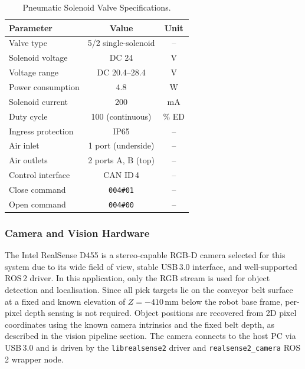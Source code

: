 \begin{table}[htbp]
    \centering
    \caption{Pneumatic Solenoid Valve Specifications.}
    \label{tab:pneumatic_spec}
    {\small
    \begin{tabular}{lcc}
        \hline
        \textbf{Parameter} & \textbf{Value} & \textbf{Unit} \\
        \hline
        Valve type              & 5/2 single-solenoid & -- \\
        Solenoid voltage        & DC 24       & V \\
        Voltage range           & DC 20.4--28.4 & V \\
        Power consumption       & 4.8         & W \\
        Solenoid current        & 200         & mA \\
        Duty cycle              & 100 (continuous) & \% ED \\
        Ingress protection      & IP65        & -- \\
        Air inlet               & 1 port (underside) & -- \\
        Air outlets             & 2 ports A, B (top) & -- \\
        Control interface       & CAN ID\,4   & -- \\
        Close command           & \texttt{004\#01} & -- \\
        Open command            & \texttt{004\#00} & -- \\
        \hline
    \end{tabular}}
\end{table} 
\subsubsection{Camera and Vision Hardware}
\hspace{1.27cm}
The Intel RealSense D455 is a stereo-capable RGB-D camera selected for this system due to its wide field of view, stable USB\,3.0 interface, and well-supported ROS\,2 driver. In this application, only the RGB stream is used for object detection and localisation. Since all pick targets lie on the conveyor belt surface at a fixed and known elevation of $Z = -410$\,mm below the robot base frame, per-pixel depth sensing is not required. Object positions are recovered from 2D pixel coordinates using the known camera intrinsics and the fixed belt depth, as described in the vision pipeline section. The camera connects to the host PC via USB\,3.0 and is driven by the \texttt{librealsense2} driver and \texttt{realsense2\_camera} ROS\,2 wrapper node.

